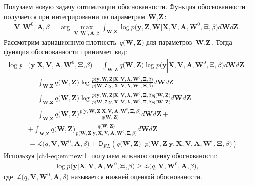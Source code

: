 \documentclass{dissert}
\begin{document}
Получаем новую задачу оптимизации обоснованности. Функция обоснованности получается при интегрировании по параметрам~$\textbf{W}, \textbf{Z}$:
\[
\label{ch4-eq:em:3}
\begin{aligned}
\mathbf{V}, \mathbf{W}^0, \textbf{A},  \beta = \arg\max_{\mathbf{V}, \mathbf{W}^0, \textbf{A}, \beta} \int_{\textbf{W}, \textbf{Z}}\log p\bigr(\mathbf{y}, \textbf{Z}, \textbf{W}|\mathbf{X}, \mathbf{V}, \textbf{A}, \textbf{W}^{0}, \bm{\Xi}, \beta\bigr)d\textbf{W}d\textbf{Z}.
\end{aligned}
\]
Рассмотрим вариационную плотность~$q\bigr(\textbf{W}, \textbf{Z}\bigr)$ для параметров~$\textbf{W}, \textbf{Z}$. Тогда функция обоснованности принимает вид:
\[
\label{ch4-eq:em:new:1}
\begin{aligned}
\log p&\bigr(\mathbf{y}|\mathbf{X}, \mathbf{V}, \textbf{A}, \textbf{W}^{0}, \bm{\Xi}, \beta\bigr) = \int_{\textbf{W}, \textbf{Z}} q\bigr(\textbf{W}, \textbf{Z}\bigr) \log p\bigr(\mathbf{y}|\mathbf{X}, \mathbf{V}, \textbf{A}, \textbf{W}^{0}, \bm{\Xi}, \beta\bigr)d\textbf{W}d\textbf{Z} =\\
&= \int_{\textbf{W}, \textbf{Z}} q\bigr(\textbf{W}, \textbf{Z}\bigr)\log \frac{p\bigr(\mathbf{y}, \textbf{W}, \textbf{Z}|\mathbf{X}, \mathbf{V}, \textbf{A}, \textbf{W}^{0}, \bm{\Xi}, \beta\bigr)}{p\bigr(\textbf{W}, \textbf{Z}|\mathbf{y}, \mathbf{X}, \mathbf{V}, \textbf{A}, \textbf{W}^{0}, \bm{\Xi}, \beta\bigr)}d\textbf{W}d\textbf{Z}=\\
&= \int_{\textbf{W}, \textbf{Z}} q\bigr(\textbf{W}, \textbf{Z}\bigr)\log \frac{p\bigr(\mathbf{y}, \textbf{W}, \textbf{Z}|\mathbf{X}, \mathbf{V}, \textbf{A}, \textbf{W}^{0}, \bm{\Xi}, \beta\bigr)q\bigr(\textbf{W}, \textbf{Z}\bigr)}{p\bigr(\textbf{W}, \textbf{Z}|\mathbf{y}, \mathbf{X}, \mathbf{V}, \textbf{A}, \textbf{W}^{0}, \bm{\Xi}, \beta\bigr)q\bigr(\textbf{W}, \textbf{Z}\bigr)}d\textbf{W}d\textbf{Z}=\\
&= \int_{\textbf{W}, \textbf{Z}} q\bigr(\textbf{W}, \textbf{Z}\bigr)\frac{p\bigr(\mathbf{y}, \textbf{W}, \textbf{Z}|\mathbf{X}, \mathbf{V}, \textbf{A}, \textbf{W}^{0}, \bm{\Xi}, \beta\bigr)}{q\bigr(\textbf{W}, \textbf{Z}\bigr)}d\textbf{W}d\textbf{Z}+\\
&+\int_{\textbf{W}, \textbf{Z}} q\bigr(\textbf{W}, \textbf{Z}\bigr)\frac{q\bigr(\textbf{W}, \textbf{Z}\bigr)}{p\bigr(\textbf{W}, \textbf{Z}|\mathbf{y}, \mathbf{X}, \mathbf{V}, \textbf{A}, \textbf{W}^{0}, \bm{\Xi}, \beta\bigr)}d\textbf{W}d\textbf{Z}=\\
&=\mathcal{L}\bigr(q, \textbf{V}, \textbf{W}^{0}, \textbf{A}, \beta\bigr)+\mathsf{D}_{KL}\left(q\bigr(\textbf{W}, \textbf{Z}\bigr)||p\bigr(\textbf{W}, \textbf{Z}|\mathbf{y}, \mathbf{X}, \mathbf{V}, \textbf{A}, \textbf{W}^{0}, \bm{\Xi}, \beta\bigr)\right)
\end{aligned}
\]
Используя \eqref{ch4-eq:em:new:1} получаем нижнюю оценку обоснованости:
\[
\label{ch4-eq:em:new:2}
\begin{aligned}
\log p\bigr(\mathbf{y}|\mathbf{X}, \mathbf{V}, \textbf{A}, \textbf{W}^{0}, \bm{\Xi}, \beta\bigr)\geq \mathcal{L}\bigr(q, \textbf{V}, \textbf{W}^{0}, \textbf{A}, \beta\bigr),
\end{aligned}
\]
где~$\mathcal{L}\bigr(q, \textbf{V}, \textbf{W}^{0}, \textbf{A}, \beta\bigr)$ называется нижней оценкой обоснованости.
\end{document}
